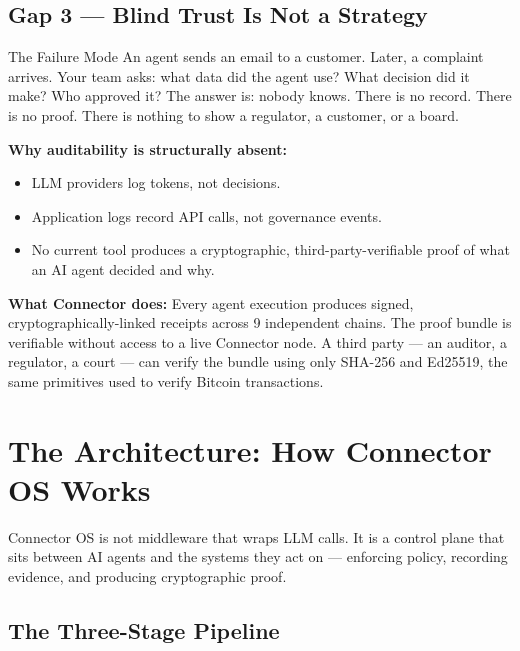 \documentclass[11pt,a4paper]{article}
\begin{document}
\subsection{Gap 3 — Blind Trust Is Not a Strategy}

\begin{dangerbox}{The Failure Mode}
An agent sends an email to a customer. Later, a complaint arrives. Your team asks: what data did
the agent use? What decision did it make? Who approved it? The answer is: nobody knows. There is no
record. There is no proof. There is nothing to show a regulator, a customer, or a board.
\end{dangerbox}

\textbf{Why auditability is structurally absent:}
\begin{itemize}
  \item LLM providers log tokens, not decisions.
  \item Application logs record API calls, not governance events.
  \item No current tool produces a cryptographic, third-party-verifiable proof of what an AI agent decided and why.
\end{itemize}

\textbf{What Connector does:} Every agent execution produces signed, cryptographically-linked receipts
across 9 independent chains. The proof bundle is verifiable without access to a live Connector node.
A third party — an auditor, a regulator, a court — can verify the bundle using only SHA-256 and Ed25519,
the same primitives used to verify Bitcoin transactions.

\clearpage

\section{The Architecture: How Connector OS Works}
\label{sec:architecture}

Connector OS is not middleware that wraps LLM calls. It is a control plane that sits between AI agents
and the systems they act on — enforcing policy, recording evidence, and producing cryptographic proof.

\subsection{The Three-Stage Pipeline}
\end{document}

